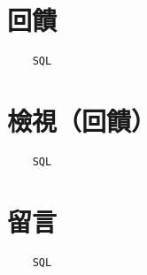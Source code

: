 \documentclass[12pt,a4paper]{article}
\begin{document}
\section*{回饋}
\begin{lstlisting}
    SQL
\end{lstlisting}

\section*{檢視（回饋）}
\begin{lstlisting}
    SQL
\end{lstlisting}

\section*{留言}
\begin{lstlisting}
    SQL
\end{lstlisting}
\end{document}
